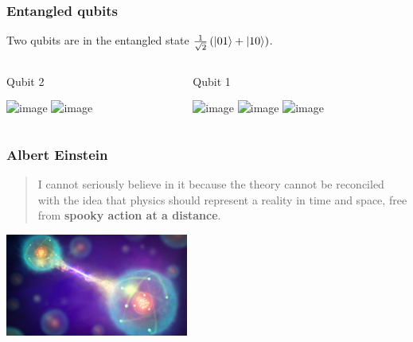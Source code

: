 \documentclass[10pt]{beamer}
\begin{document}
\begin{frame}
  \frametitle{Entangled qubits}
  \centering
      Two qubits are in the entangled state $\frac{1}{\sqrt{2}}\left( \ket{01} + \ket{10} \right)$.
  \begin{columns}
    \begin{column}{0.5\linewidth}
      \begin{center}
        Qubit 2

        \includegraphics<1-2>[height=3cm]{img/coin_spinning.jpg}
        \includegraphics<3->[height=3cm]{img/euro-1.jpg}
        \end{center}
    \end{column}
    \begin{column}{0.5\linewidth}
      \begin{center}
        Qubit 1

        \includegraphics<1>[height=3cm]{img/coin_spinning.jpg}
        \includegraphics<2>[height=3cm]{img/coin-measure.png}
        \includegraphics<3->[height=3cm]{img/euro-0.jpg}
        \end{center}
    \end{column}
  \end{columns}
\end{frame}
\begin{frame}
  \frametitle{Albert Einstein}
    \centering
  \begin{quote}
    I cannot seriously believe in it because the theory cannot be reconciled with the idea that physics should represent a reality in time and space, free from \textbf{spooky action at a distance}.
    \end{quote}
    \includegraphics[width=6cm]{img/entanglement.jpg}
\end{frame}
\end{document}
